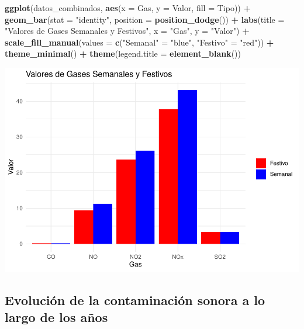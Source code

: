 \documentclass[notspecified,article,submit,moreauthors,pdftex]{Definitions/mdpi}
\newenvironment{Shaded}{\begin{snugshade}}{\end{snugshade}}
\newcommand{\AttributeTok}[1]{\textcolor[rgb]{0.13,0.29,0.53}{#1}}
\newcommand{\FunctionTok}[1]{\textcolor[rgb]{0.13,0.29,0.53}{\textbf{#1}}}
\newcommand{\NormalTok}[1]{#1}
\newcommand{\OtherTok}[1]{\textcolor[rgb]{0.56,0.35,0.01}{#1}}
\newcommand{\SpecialCharTok}[1]{\textcolor[rgb]{0.81,0.36,0.00}{\textbf{#1}}}
\newcommand{\StringTok}[1]{\textcolor[rgb]{0.31,0.60,0.02}{#1}}
\begin{document}
\begin{Shaded}
\begin{Highlighting}[]
\FunctionTok{ggplot}\NormalTok{(datos\_combinados, }\FunctionTok{aes}\NormalTok{(}\AttributeTok{x =}\NormalTok{ Gas, }\AttributeTok{y =}\NormalTok{ Valor, }\AttributeTok{fill =}\NormalTok{ Tipo)) }\SpecialCharTok{+}
  \FunctionTok{geom\_bar}\NormalTok{(}\AttributeTok{stat =} \StringTok{"identity"}\NormalTok{, }\AttributeTok{position =} \FunctionTok{position\_dodge}\NormalTok{()) }\SpecialCharTok{+}
  \FunctionTok{labs}\NormalTok{(}\AttributeTok{title =} \StringTok{"Valores de Gases Semanales y Festivos"}\NormalTok{,}
       \AttributeTok{x =} \StringTok{"Gas"}\NormalTok{,}
       \AttributeTok{y =} \StringTok{"Valor"}\NormalTok{) }\SpecialCharTok{+}
  \FunctionTok{scale\_fill\_manual}\NormalTok{(}\AttributeTok{values =} \FunctionTok{c}\NormalTok{(}\StringTok{"Semanal"} \OtherTok{=} \StringTok{"blue"}\NormalTok{, }\StringTok{"Festivo"} \OtherTok{=} \StringTok{"red"}\NormalTok{)) }\SpecialCharTok{+}
  \FunctionTok{theme\_minimal}\NormalTok{() }\SpecialCharTok{+}
  \FunctionTok{theme}\NormalTok{(}\AttributeTok{legend.title =} \FunctionTok{element\_blank}\NormalTok{())}
\end{Highlighting}
\end{Shaded}

\includegraphics{Memoria_files/figure-latex/unnamed-chunk-28-1.pdf}

\hypertarget{evoluciuxf3n-de-la-contaminaciuxf3n-sonora-a-lo-largo-de-los-auxf1os}{%
\subsection{Evolución de la contaminación sonora a lo largo de los
años}\label{evoluciuxf3n-de-la-contaminaciuxf3n-sonora-a-lo-largo-de-los-auxf1os}}
\end{document}
